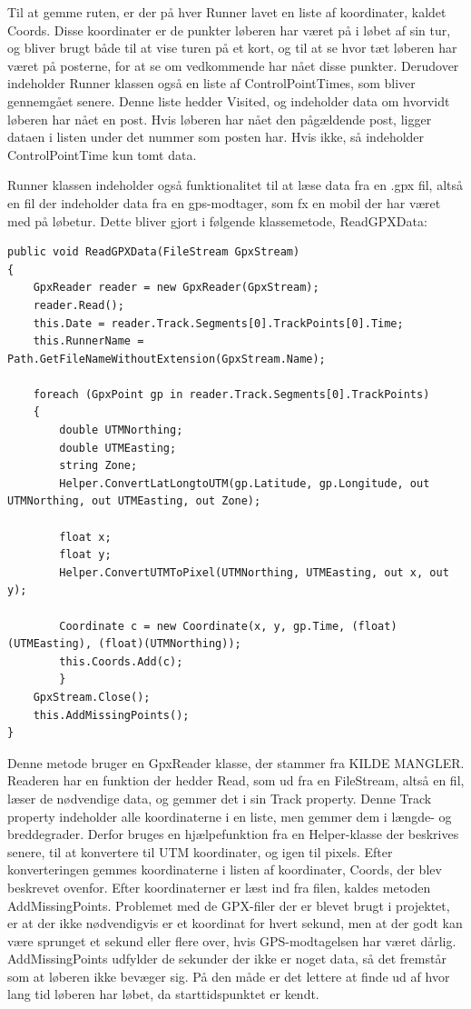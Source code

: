 Til at gemme ruten, er der på hver Runner lavet en liste af koordinater, kaldet Coords.
Disse koordinater er de punkter løberen har været på i løbet af sin tur, og bliver brugt både til at vise turen på et kort, og til at se hvor tæt løberen har været på posterne, for at se om vedkommende har nået disse punkter.
Derudover indeholder Runner klassen også en liste af ControlPointTimes, som bliver gennemgået senere. Denne liste hedder Visited, og indeholder data om hvorvidt løberen har nået en post. Hvis løberen har nået den pågældende post, ligger dataen i listen under det nummer som posten har. Hvis ikke, så indeholder ControlPointTime kun tomt data. 
 

Runner klassen indeholder også funktionalitet til at læse data fra en .gpx fil, altså en fil der indeholder data fra en gps-modtager, som fx en mobil der har været med på løbetur.
Dette bliver gjort i følgende klassemetode, ReadGPXData:


\begin{lstlisting}
public void ReadGPXData(FileStream GpxStream)
{
	GpxReader reader = new GpxReader(GpxStream);
	reader.Read();
	this.Date = reader.Track.Segments[0].TrackPoints[0].Time;
	this.RunnerName = Path.GetFileNameWithoutExtension(GpxStream.Name);

	foreach (GpxPoint gp in reader.Track.Segments[0].TrackPoints)
	{
		double UTMNorthing;
		double UTMEasting;
		string Zone;
        Helper.ConvertLatLongtoUTM(gp.Latitude, gp.Longitude, out UTMNorthing, out UTMEasting, out Zone);

        float x;
        float y;
        Helper.ConvertUTMToPixel(UTMNorthing, UTMEasting, out x, out y);

        Coordinate c = new Coordinate(x, y, gp.Time, (float)(UTMEasting), (float)(UTMNorthing));
        this.Coords.Add(c);
        }
    GpxStream.Close();
    this.AddMissingPoints();
}
\end{lstlisting}

Denne metode bruger en GpxReader klasse, der stammer fra KILDE MANGLER. Readeren har en funktion der hedder Read, som ud fra en FileStream, altså en fil, læser de nødvendige data, og gemmer det i sin Track property. Denne Track property indeholder alle koordinaterne i en liste, men gemmer dem i længde- og breddegrader. Derfor bruges en hjælpefunktion fra en Helper-klasse der beskrives senere, til at konvertere til UTM koordinater, og igen til pixels. Efter konverteringen gemmes koordinaterne i listen af koordinater, Coords, der blev beskrevet ovenfor. 
Efter koordinaterner er læst ind fra filen, kaldes metoden AddMissingPoints. Problemet med de GPX-filer der er blevet brugt i projektet, er at der ikke nødvendigvis er et koordinat for hvert sekund, men at der godt kan være sprunget et sekund eller flere over, hvis GPS-modtagelsen har været dårlig. AddMissingPoints udfylder de sekunder der ikke er noget data, så det fremstår som at løberen ikke bevæger sig. På den måde er det lettere at finde ud af hvor lang tid løberen har løbet, da starttidspunktet er kendt. 
